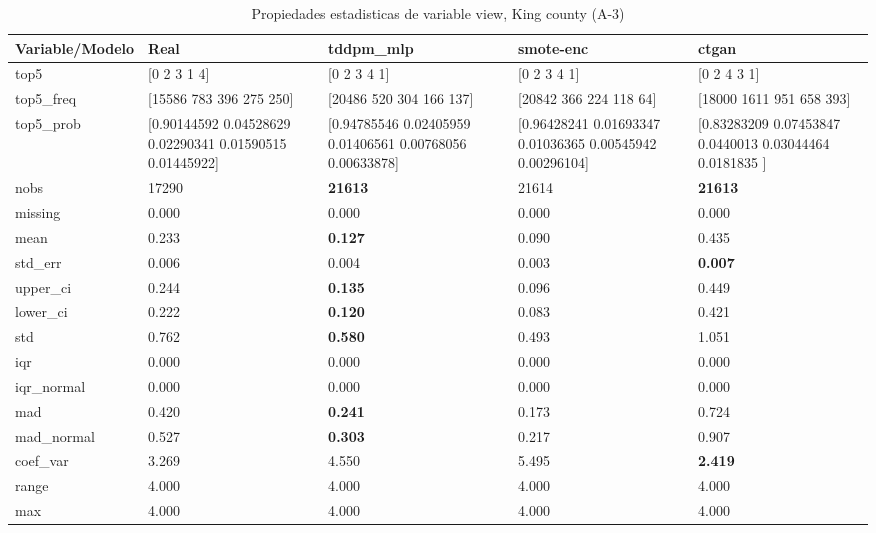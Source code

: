 \begin{table}[H]
\centering
\fontsize{8}{14}\selectfont
\caption{Propiedades  estadisticas de variable view, King county (A-3)}
\label{table-stats-king county-a-3-view}
\begin{tabular}{|l|m{10em}|m{10em}|m{10em}|m{10em}|}
\hline
 \rowcolor[gray]{0.8}
Variable/Modelo & Real & tddpm\_mlp & smote-enc & ctgan \\
\hline top5 & [0 2 3 1 4] & [0 2 3 4 1] & [0 2 3 4 1] & [0 2 4 3 1] \\
\hline top5\_freq & [15586   783   396   275   250] & [20486   520   304   166   137] & [20842   366   224   118    64] & [18000  1611   951   658   393] \\
\hline top5\_prob & [0.90144592 0.04528629 0.02290341 0.01590515 0.01445922] & [0.94785546 0.02405959 0.01406561 0.00768056 0.00633878] & [0.96428241 0.01693347 0.01036365 0.00545942 0.00296104] & [0.83283209 0.07453847 0.0440013  0.03044464 0.0181835 ] \\
\hline nobs & 17290 & \bfseries 21613 & \cellcolor[rgb]{0.9, 0.54, 0.52} 21614 & \bfseries 21613 \\
\hline missing & 0.000 & 0.000 & 0.000 & 0.000 \\
\hline mean & 0.233 & \bfseries 0.127 & 0.090 & \cellcolor[rgb]{0.9, 0.54, 0.52} 0.435 \\
\hline std\_err & 0.006 & 0.004 & \cellcolor[rgb]{0.9, 0.54, 0.52} 0.003 & \bfseries 0.007 \\
\hline upper\_ci & 0.244 & \bfseries 0.135 & 0.096 & \cellcolor[rgb]{0.9, 0.54, 0.52} 0.449 \\
\hline lower\_ci & 0.222 & \bfseries 0.120 & 0.083 & \cellcolor[rgb]{0.9, 0.54, 0.52} 0.421 \\
\hline std & 0.762 & \bfseries 0.580 & 0.493 & \cellcolor[rgb]{0.9, 0.54, 0.52} 1.051 \\
\hline iqr & 0.000 & 0.000 & 0.000 & 0.000 \\
\hline iqr\_normal & 0.000 & 0.000 & 0.000 & 0.000 \\
\hline mad & 0.420 & \bfseries 0.241 & 0.173 & \cellcolor[rgb]{0.9, 0.54, 0.52} 0.724 \\
\hline mad\_normal & 0.527 & \bfseries 0.303 & 0.217 & \cellcolor[rgb]{0.9, 0.54, 0.52} 0.907 \\
\hline coef\_var & 3.269 & 4.550 & \cellcolor[rgb]{0.9, 0.54, 0.52} 5.495 & \bfseries 2.419 \\
\hline range & 4.000 & 4.000 & 4.000 & 4.000 \\
\hline max & 4.000 & 4.000 & 4.000 & 4.000 \\

\end{tabular}
\end{table}
